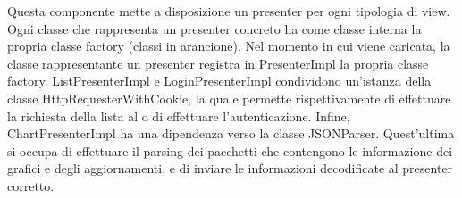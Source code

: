 Questa componente mette a disposizione un presenter per ogni tipologia di view. Ogni classe che rappresenta un presenter concreto ha come classe interna la propria classe factory (classi in arancione). Nel momento in cui viene caricata, la classe rappresentante un presenter registra in PresenterImpl la propria classe factory. ListPresenterImpl e LoginPresenterImpl condividono un'istanza della classe HttpRequesterWithCookie, la quale permette rispettivamente di effettuare la richiesta della lista al  o di effettuare l'autenticazione. 
Infine, ChartPresenterImpl ha una dipendenza verso la classe JSONParser. Quest'ultima si occupa di effettuare il parsing dei pacchetti  che contengono le informazione dei grafici e degli aggiornamenti, e di inviare le informazioni decodificate al presenter corretto.
